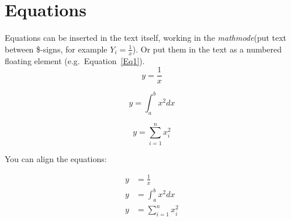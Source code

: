 \newpage

\section{Equations}
Equations can be inserted in the text itself, working in the \textit{mathmode}(put text between \$-signs, for example $Y_i=\frac{1}{x}$). Or put them in the text as a numbered floating element (e.g.\ Equation~\eqref{Eq1}).
\begin{equation}\label{Eq1}
    y=\frac{1}{x}
\end{equation}

\begin{equation}
    y=\int_{a}^{b} x^2 dx
\end{equation}

\begin{equation}
    y=\sum_{i=1}^{n} x_i^2
\end{equation}

You can align the equations:

\begin{align}
    y &=\frac{1}{x} \\
    y &=\int_{a}^{b} x^2 dx \\
    y &=\sum_{i=1}^{n} x_i^2
\end{align}
